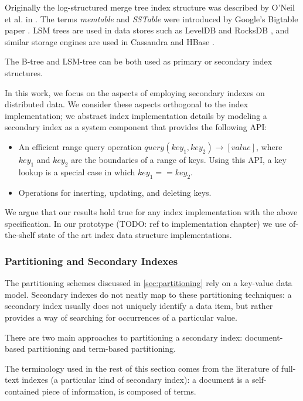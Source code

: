 Originally the log-structured merge tree index structure was described by O'Neil et al. in \cite{oneil:lsmtree}.
The terms \textit{memtable} and \textit{SSTable} were introduced by Google's Bigtable paper \cite{chang:bigtable}.
LSM trees are used in data stores such as LevelDB \cite{leveldb:implnotes} and RocksDB \cite{rocksdb:history},
and similar storage engines are used in Cassandra and HBase \cite{hbase:hfile}.

\bigskip
\noindent
The B-tree and LSM-tree can be both used as primary or secondary index structures.

In this work, we focus on the aspects of employing secondary indexes on distributed data.
We consider these aspects orthogonal to the index implementation;
we abstract index implementation details by modeling a secondary index as a system component that provides the following
API:
\begin{itemize}

  \item An efficient range query operation $query(key_1, key_2) \rightarrow [value]$,
  where $key_1$ and $key_2$ are the boundaries of a range of keys.
  Using this API, a key lookup is a special case in which $key_1 == key_2$.

  \item Operations for inserting, updating, and deleting keys.

\end{itemize}

We argue that our results hold true for any index implementation with the above specification.
In our prototype
(TODO: ref to implementation chapter)
we use of-the-shelf state of the art index data structure implementations.

\subsubsection{Partitioning and Secondary Indexes}
\label{sec:index_partitioning_background}
The partitioning schemes discussed in \ref{sec:partitioning} rely on a key-value data model.
Secondary indexes do not neatly map to these partitioning techniques:
a secondary index usually does not uniquely identify a data item, but rather provides a way of searching for occurrences
of a particular value.

There are two main approaches to partitioning a secondary index:
document-based partitioning and term-based partitioning.

The terminology used in the rest of this section comes from the literature of full-text indexes
(a particular kind of secondary index):
a document is a self-contained piece of information, is composed of terms.


